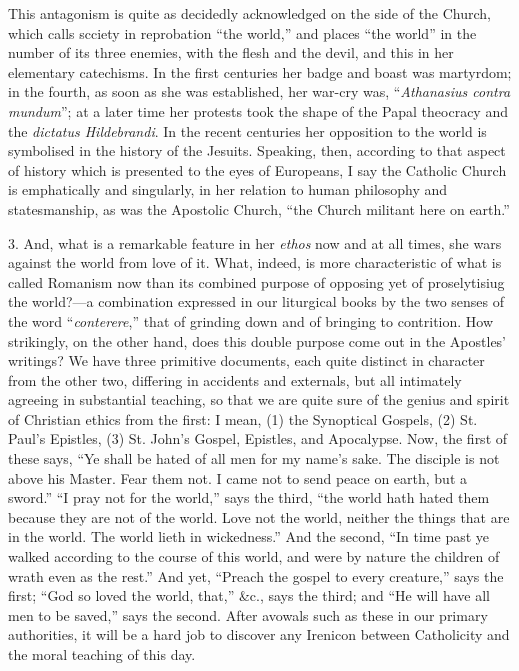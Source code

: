 This antagonism is quite as decidedly
acknowledged on the side of the Church, which calls scciety in
reprobation ``the world,'' and places ``the world'' in the number of
its three enemies, with the flesh and the devil, and this in her
elementary catechisms. In the first centuries her badge and boast was
martyrdom; in the fourth, as soon as she was established, her war-cry
was, ``\emph{Athanasius contra mundum}''; at a later time her protests
took the shape of the Papal theocracy and the \emph{dictatus Hildebrandi}.
In the recent centuries her opposition to the world is symbolised in
the history of the Jesuits. Speaking, then, according to that aspect
of history which is presented to the eyes of Europeans, I say the
Catholic Church is emphatically and singularly, in her relation to
human philosophy and statesmanship, as was the Apostolic Church, ``the
Church militant here on earth.''

3. And, what is a remarkable feature in her \emph{ethos}
now and at all times, she wars against the world from love of it.
What, indeed, is more characteristic of what is called Romanism now
than its combined purpose of opposing yet of proselytisiug the
world?—a combination expressed in our liturgical books by the two
senses of the word ``\emph{conterere},'' that of grinding down and of
bringing to contrition. How strikingly, on the other hand, does this
double purpose come out in the Apostles' writings? We have three
primitive documents, each quite distinct in character from the
other two, differing in accidents and externals, but all intimately
agreeing in substantial teaching, so that we are quite sure of the
genius and spirit of Christian ethics from the first: I mean, (1) the
Synoptical Gospels, (2) St. Paul's Epistles, (3) St. John's Gospel,
Epistles, and Apocalypse. Now, the first of these says, ``Ye shall be
hated of all men for my name's sake. The disciple is not above his
Master. Fear them not. I came not to send peace on earth, but a sword.''
``I pray not for the world,'' says the third, ``the world hath hated them
because they are not of the world. Love not the world, neither the
things that are in the world. The world lieth in wickedness.'' And the
second, ``In time past ye walked according to the course of this world,
and were by nature the children of wrath even as the rest.'' And yet, ``Preach
the gospel to every creature,'' says the first; ``God so loved the
world, that,'' \&c., says the third; and ``He will have all men to be
saved,'' says the second. After avowals such as these in our primary
authorities, it will be a hard job to discover any Irenicon between
Catholicity and the moral teaching of this day.

